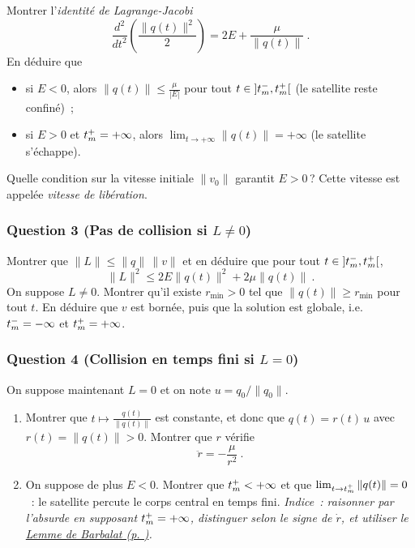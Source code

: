 
Montrer l'\emph{identité de Lagrange-Jacobi} \[
\frac{d^2}{dt^2}\left(\frac{\|q(t)\|^2}{2}\right) = 2E + \frac{\mu}{\|q(t)\|} \ .
\] En déduire que

\begin{itemize}
\tightlist
\item
  si \(E<0\), alors \(\|q(t)\|\leq \frac{\mu}{|E|}\) pour tout
  \(t\in\left]t_m^-,t_m^+\right[\) (le satellite reste confiné)~;
\item
  si \(E>0\) et \(t_m^+=+\infty\), alors
  \(\lim_{t\to+\infty}\|q(t)\|=+\infty\) (le satellite s'échappe).
\end{itemize}

Quelle condition sur la vitesse initiale \(\|v_0\|\) garantit
\(E>0\)\,? Cette vitesse est appelée \emph{vitesse de libération}.

\hypertarget{kepler-3}{%
\subsubsection*{Question 3 (Pas de collision si \texorpdfstring{\(L\neq
0\)}{L non nul})}\label{kepler-3}}


Montrer que \(\|L\|\leq \|q\|\,\|v\|\) et en déduire que pour tout
\(t\in\left]t_m^-,t_m^+\right[\), \[
\|L\|^2 \leq 2E\|q(t)\|^2 + 2\mu \|q(t)\| \ .
\] On suppose \(L\neq 0\). Montrer qu'il existe \(r_{\min}>0\) tel que
\(\|q(t)\|\geq r_{\min}\) pour tout \(t\). En déduire que \(v\) est
bornée, puis que la solution est globale, i.e. \(t_m^-=-\infty\) et
\(t_m^+=+\infty\).

\hypertarget{kepler-4}{%
\subsubsection*{Question 4 (Collision en temps fini si
\texorpdfstring{\(L=0\)}{L nul})}\label{kepler-4}}


On suppose maintenant \(L=0\) et on note \(u = q_0/\|q_0\|\).

\begin{enumerate}
\def\labelenumi{\alph{enumi})}
\tightlist
\item
  Montrer que \(t\mapsto \frac{q(t)}{\|q(t)\|}\) est constante, et donc
  que \(q(t) = r(t)\, u\) avec \(r(t)=\|q(t)\|>0\). Montrer que \(r\)
  vérifie \[
  \ddot{r} = -\frac{\mu}{r^2} \ .
  \]
\item
  On suppose de plus \(E<0\). Montrer que \(t_m^+<+\infty\) et que
  \(\lim_{t\to t_m^+}\|q(t)\| = 0\)~: le satellite percute le corps
  central en temps fini. \emph{Indice~: raisonner par l'absurde en
  supposant \(t_m^+=+\infty\), distinguer selon le signe de \(\dot r\),
  et utiliser le \protect\hyperlink{theo_barbalat}{Lemme de Barbalat
  (p. \pageref*{theo_barbalat})}.}
\end{enumerate}

